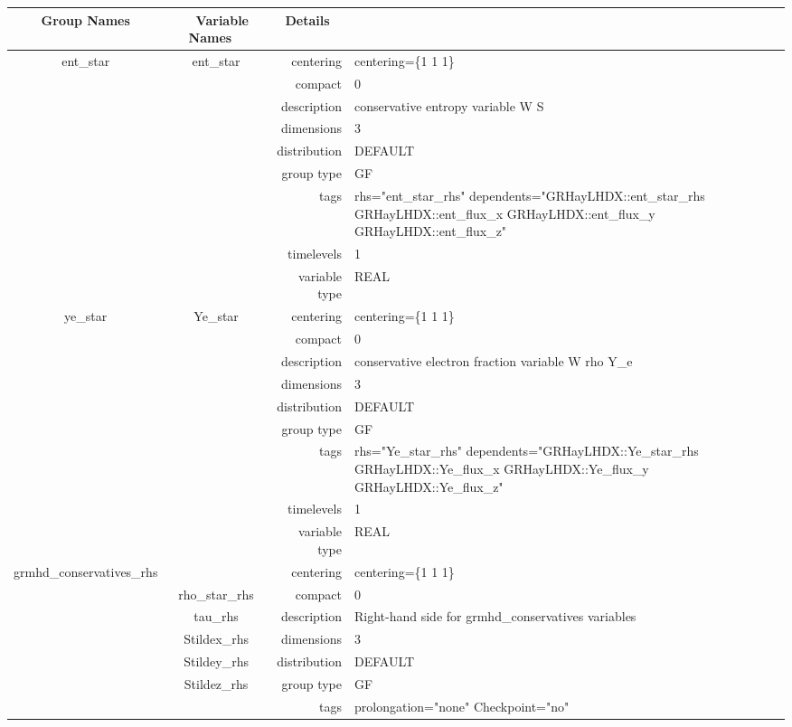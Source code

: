 \documentclass{article}
\begin{document}
\vspace{5mm}
\vspace{5mm}

\begin{tabular*}{150mm}{|c|c@{\extracolsep{\fill}}|rl|} \hline 
~ {\bf Group Names} ~ & ~ {\bf Variable Names} ~  &{\bf Details} ~ & ~ \\ 
\hline 
ent\_star & ent\_star & centering & centering=\{1 1 1\} \\ 
 &  & compact & 0 \\ 
 &  & description & conservative entropy variable W S \\ 
 &  & dimensions & 3 \\ 
 &  & distribution & DEFAULT \\ 
 &  & group type & GF \\ 
 &  & tags & rhs="ent\_star\_rhs" dependents="GRHayLHDX::ent\_star\_rhs GRHayLHDX::ent\_flux\_x GRHayLHDX::ent\_flux\_y GRHayLHDX::ent\_flux\_z" \\ 
 &  & timelevels & 1 \\ 
 &  & variable type & REAL \\ 
\hline 
ye\_star & Ye\_star & centering & centering=\{1 1 1\} \\ 
 &  & compact & 0 \\ 
 &  & description & conservative electron fraction variable W rho Y\_e \\ 
 &  & dimensions & 3 \\ 
 &  & distribution & DEFAULT \\ 
 &  & group type & GF \\ 
 &  & tags & rhs="Ye\_star\_rhs" dependents="GRHayLHDX::Ye\_star\_rhs GRHayLHDX::Ye\_flux\_x GRHayLHDX::Ye\_flux\_y GRHayLHDX::Ye\_flux\_z" \\ 
 &  & timelevels & 1 \\ 
 &  & variable type & REAL \\ 
\hline 
grmhd\_conservatives\_rhs &  & centering & centering=\{1 1 1\} \\ 
 & rho\_star\_rhs & compact & 0 \\ 
 & tau\_rhs & description & Right-hand side for grmhd\_conservatives variables \\ 
 & Stildex\_rhs & dimensions & 3 \\ 
 & Stildey\_rhs & distribution & DEFAULT \\ 
 & Stildez\_rhs & group type & GF \\ 
 &  & tags & prolongation="none" Checkpoint="no" \\ 

\end{tabular*}
\end{document}
